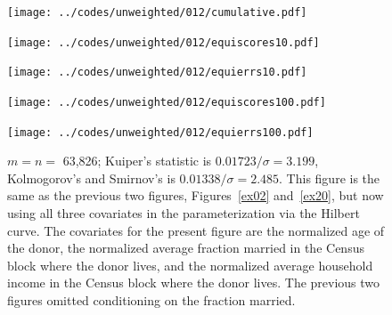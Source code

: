 \documentclass[]{fairmeta}
\begin{document}
\begin{figure}
\begin{centering}

\parbox{\imsize}{\texttt{[image: ../codes/unweighted/012/cumulative.pdf]}}

\vspace{\vertsep}

\parbox{\imsize}{\texttt{[image: ../codes/unweighted/012/equiscores10.pdf]}}
\quad\quad
\parbox{\imsize}{\texttt{[image: ../codes/unweighted/012/equierrs10.pdf]}}

\vspace{\vertsep}

\parbox{\imsize}{\texttt{[image: ../codes/unweighted/012/equiscores100.pdf]}}
\quad\quad
\parbox{\imsize}{\texttt{[image: ../codes/unweighted/012/equierrs100.pdf]}}

\end{centering}
\caption{$m = n =$ 63,826;
         Kuiper's statistic is $0.01723 / \sigma = 3.199$,
         Kolmogorov's and Smirnov's is $0.01338 / \sigma = 2.485$.
         This figure is the same as the previous two figures,
         Figures~\ref{ex02} and~\ref{ex20}, but now using all three covariates
         in the parameterization via the Hilbert curve.
         The covariates for the present figure are the normalized age
         of the donor, the normalized average fraction married
         in the Census block where the donor lives, and the normalized
         average household income in the Census block where the donor lives.
         The previous two figures omitted conditioning on the fraction married.
}
\label{ex012}
\end{figure}
\end{document}
